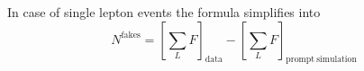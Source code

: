 In case of single lepton events the formula simplifies into
\begin{equation}
  N^\mathrm{fakes} =
  {\left[ \sum\limits_{L}F \right]}_\mathrm{data} -
  {\left[ \sum\limits_{L}F \right]}_\mathrm{prompt~simulation}
\end{equation}




\pagebreak


